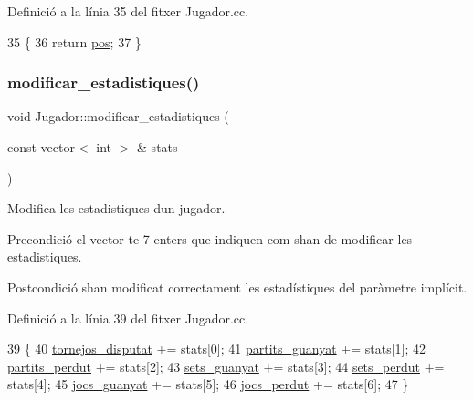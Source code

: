 Definició a la línia 35 del fitxer Jugador.\+cc.


\begin{DoxyCode}
35                               \{
36     \textcolor{keywordflow}{return} \mbox{\hyperlink{class_jugador_a25a7eeb0d334b2fe60bb490704c6626d}{pos}};
37 \}
\end{DoxyCode}
\mbox{\label{class_jugador_ab002dbf870a93bbe498d1f76f9e43e43}} 
\subsubsection{\texorpdfstring{modificar\+\_\+estadistiques()}{modificar\_estadistiques()}}
{\footnotesize\ttfamily void Jugador\+::modificar\+\_\+estadistiques (\begin{DoxyParamCaption}\item[{const vector$<$ int $>$ \&}]{stats }\end{DoxyParamCaption})}



Modifica les estadistiques d\textquotesingle{}un jugador. 

\begin{DoxyPrecond}{Precondició}
el vector te 7 enters que indiquen com s\textquotesingle{}han de modificar les estadistiques. 
\end{DoxyPrecond}
\begin{DoxyPostcond}{Postcondició}
s\textquotesingle{}han modificat correctament les estadístiques del paràmetre implícit. 
\end{DoxyPostcond}


Definició a la línia 39 del fitxer Jugador.\+cc.


\begin{DoxyCode}
39                                                               \{
40     \mbox{\hyperlink{class_jugador_a2ef0821abd64385a58561b039c37a469}{tornejos\_disputat}} += stats[0];
41     \mbox{\hyperlink{class_jugador_a6bf9a674be86bfce7945f7c0dfbe531f}{partits\_guanyat}} += stats[1];
42     \mbox{\hyperlink{class_jugador_ad1e6a56bea30a1449dbb37871c288fcf}{partits\_perdut}} += stats[2];
43     \mbox{\hyperlink{class_jugador_a396b226c722425d387f36e239fc9855c}{sets\_guanyat}} += stats[3];
44     \mbox{\hyperlink{class_jugador_a7c9fcb3ec52c2c400e7cf8faaf945426}{sets\_perdut}} += stats[4];
45     \mbox{\hyperlink{class_jugador_a0eb97835e7dd3143f626c1d15edb7392}{jocs\_guanyat}} += stats[5];
46     \mbox{\hyperlink{class_jugador_a04e5cf90e57c490b4c088e29763479f7}{jocs\_perdut}} += stats[6];
47 \}
\end{DoxyCode}


